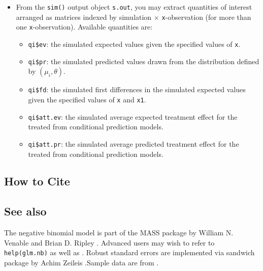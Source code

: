 \begin{itemize}
\item From the {\tt sim()} output object {\tt s.out}, you may extract
  quantities of interest arranged as matrices indexed by simulation
  $\times$ {\tt x}-observation (for more than one {\tt x}-observation).
  Available quantities are:

   \begin{itemize}
   \item {\tt qi\$ev}: the simulated expected values given the specified
     values of {\tt x}.
   \item {\tt qi\$pr}: the simulated predicted values drawn from the
     distribution defined by $(\mu_i, \theta)$.  
   \item {\tt qi\$fd}: the simulated first differences in the
     simulated expected values given the specified values of {\tt x}
     and {\tt x1}.
   \item {\tt qi\$att.ev}: the simulated average expected treatment
     effect for the treated from conditional prediction models.  
   \item {\tt qi\$att.pr}: the simulated average predicted treatment
     effect for the treated from conditional prediction models.  
   \end{itemize}
\end{itemize}

\subsection* {How to Cite} 




\subsection* {See also}
The negative binomial model is part of the MASS package by William N. Venable and Brian D. Ripley \citep{VenRip02}. Advanced users may wish to refer to \texttt{help(glm.nb)} as well as \cite{McCNel89}. Robust standard errors are implemented via sandwich package by Achim Zeileis \citep{Zeileis04}.Sample data are from \cite{Martin92}.



 






